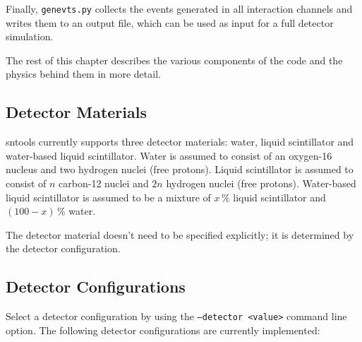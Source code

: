 \documentclass[11pt, oneside]{article}
\begin{document}
Finally, \texttt{genevts.py} collects the events generated in all interaction channels and writes them to an output file, which can be used as input for a full detector simulation.

The rest of this chapter describes the various components of the code and the physics behind them in more detail.


\subsection{Detector Materials}
sntools currently supports three detector materials: water, liquid scintillator and water-based liquid scintillator.
Water is assumed to consist of an oxygen-16 nucleus and two hydrogen nuclei (free protons).
Liquid scintillator is assumed to consist of $n$ carbon-12 nuclei and $2n$ hydrogen nuclei (free protons).
Water-based liquid scintillator is assumed to be a mixture of $x\,\%$ liquid scintillator and $(100-x)\,\%$ water.

The detector material doesn’t need to be specified explicitly; it is determined by the detector configuration.


\subsection{Detector Configurations}\label{sec:detector-configurations}
Select a detector configuration by using the \texttt{--detector <value>} command line option. The following detector configurations are currently implemented:
\end{document}
